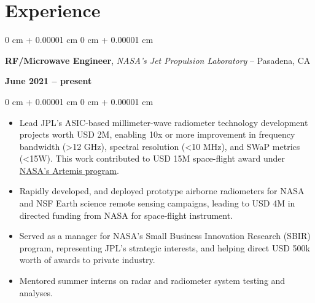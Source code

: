 \documentclass[10pt, letterpaper]{article}
\newenvironment{highlights}{
    \begin{itemize}[
        topsep=0.10 cm,
        parsep=0.10 cm,
        partopsep=0pt,
        itemsep=0pt,
        leftmargin=0 cm + 10pt     
    ]
}{
    \end{itemize}
} %
\newenvironment{onecolentry}{
    \begin{adjustwidth}{
        0 cm + 0.00001 cm
    }{
        0 cm + 0.00001 cm
    }
}{
    \end{adjustwidth}
} %
\newenvironment{twocolentry}[2][]{
    \onecolentry
    \def\secondColumn{#2}
    \setcolumnwidth{\fill, 4.5 cm}
    \begin{paracol}{2}
}{
    \switchcolumn \raggedleft \secondColumn
    \end{paracol}
    \endonecolentry
} %
\begin{document}
        \section{Experience}
        \begin{twocolentry}{
            \textbf{June 2021 – present}
        }
            \textbf{RF/Microwave Engineer}, \textit{NASA's Jet Propulsion Laboratory} -- Pasadena, CA
        \end{twocolentry}
        \vspace{0.30 cm}
        \begin{onecolentry}  
        \justifying
            \begin{highlights}
                \item Lead JPL's ASIC-based millimeter-wave radiometer technology development projects worth USD 2M, enabling 10x or more improvement in frequency bandwidth (>12 GHz), spectral resolution (<10 MHz), and SWaP metrics (<15W). This work contributed to USD 15M space-flight award under  \href{https://www.nasa.gov/news-release/nasa-selects-instruments-for-artemis-lunar-terrain-vehicle/}{NASA's Artemis program}.
                \item Rapidly developed, and deployed prototype airborne radiometers for NASA and NSF Earth science remote sensing campaigns, leading to USD 4M in directed funding from NASA for space-flight instrument.
                \item Served as a manager for NASA's Small Business Innovation Research (SBIR) program, representing JPL's strategic interests, and helping direct USD 500k worth of awards to private industry. 
                \item Mentored summer interns on radar and radiometer system testing and analyses.  
            \end{highlights}
        \end{onecolentry}

        \vspace{0.4 cm}
\end{document}
